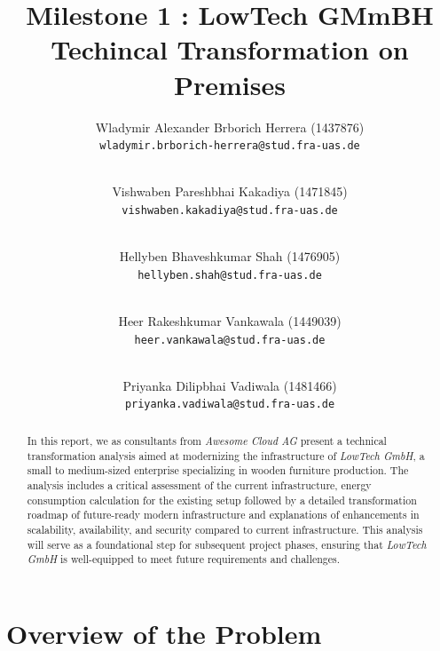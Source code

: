 \documentclass{llncs}
\newcommand{\what}{Milestone 1 : LowTech GMmBH Techincal Transformation on Premises}
\begin{document}
%
%
%
\mainmatter              %
%
\title{\what}
%
\author{
  Wladymir Alexander Brborich Herrera (1437876)\\
  \texttt{wladymir.brborich-herrera@stud.fra-uas.de}
  \and\\ 
  Vishwaben Pareshbhai Kakadiya (1471845)\\
  \texttt{vishwaben.kakadiya@stud.fra-uas.de}
  \and\\
  Hellyben Bhaveshkumar Shah (1476905)\\
  \texttt{hellyben.shah@stud.fra-uas.de}
  \and\\
  Heer Rakeshkumar Vankawala (1449039)
  \\
  \texttt{heer.vankawala@stud.fra-uas.de}
  \and\\
  Priyanka Dilipbhai Vadiwala (1481466)\\
  \texttt{priyanka.vadiwala@stud.fra-uas.de}
}
%

\maketitle              %

\begin{abstract}
  In this report, we as consultants from \textit{Awesome Cloud AG} present a technical transformation analysis aimed at modernizing the infrastructure of \textit{LowTech GmbH}, 
  a small to medium-sized enterprise specializing in wooden furniture production. 
  The analysis includes a critical assessment of the current infrastructure, energy consumption calculation for the existing setup 
  followed by a detailed transformation roadmap of future-ready modern infrastructure and explanations of enhancements in scalability, availability, and security compared to current infrastructure. 
  This analysis will serve as a foundational step for subsequent project phases, ensuring that \textit{LowTech GmbH} is well-equipped to meet future requirements and challenges.
\end{abstract}

\section{Overview of the Problem}
\end{document}
